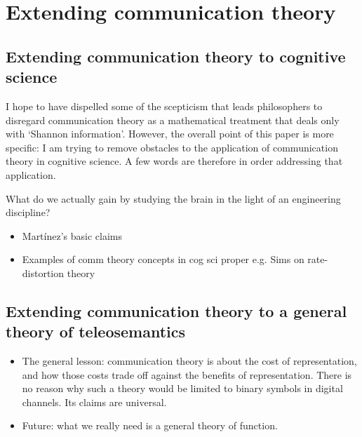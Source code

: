 \section{Extending communication theory}\label{sec:extending}

\subsection{Extending communication theory to cognitive science}

I hope to have dispelled some of the scepticism that leads philosophers to disregard communication theory as a mathematical treatment that deals only with `Shannon information'.
However, the overall point of this paper is more specific: I am trying to remove obstacles to the application of communication theory in cognitive science.
A few words are therefore in order addressing that application.

What do we actually gain by studying the brain in the light of an engineering discipline?

\begin{itemize}
    \item Mart\'{i}nez's basic claims
    \item Examples of comm theory concepts in cog sci proper e.g. Sims on rate-distortion theory
\end{itemize}


\subsection{Extending communication theory to a general theory of teleosemantics}

\begin{itemize}
    \item The general lesson: communication theory is about the cost of representation, and how those costs trade off against the benefits of representation. There is no reason why such a theory would be limited to binary symbols in digital channels. Its claims are universal.
    \item Future: what we really need is a general theory of function.
\end{itemize}